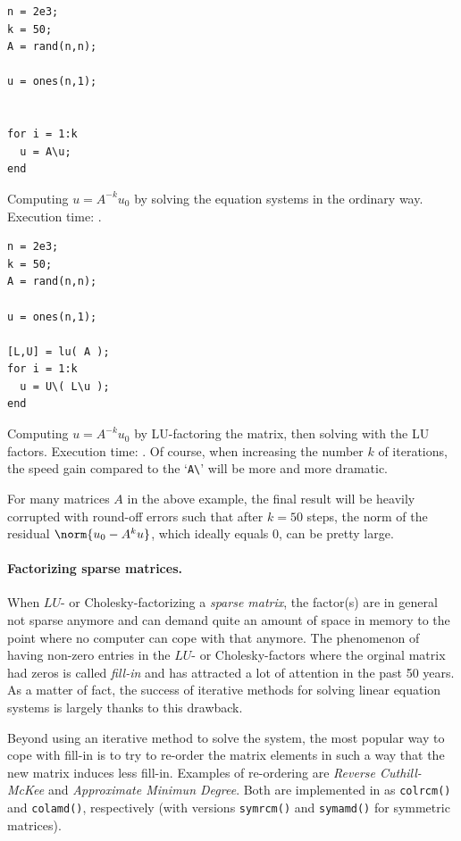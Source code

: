 \hfill
\begin{minipage}[t]{.45\textwidth}
\begin{lstlisting}[framerule=2pt,rulecolor=\color{badred}]
n = 2e3;
k = 50;
A = rand(n,n);

u = ones(n,1);


for i = 1:k
  u = A\u;
end
\end{lstlisting}
Computing $u = A^{-k}u_0$ by solving the equation systems in the ordinary way. Execution time: .
\end{minipage}
\hfill
\begin{minipage}[t]{.45\textwidth}
\begin{lstlisting}[framerule=2pt,rulecolor=\color{goodgreen}]
n = 2e3;
k = 50;
A = rand(n,n);

u = ones(n,1);

[L,U] = lu( A );
for i = 1:k
  u = U\( L\u );
end
\end{lstlisting}
Computing $u = A^{-k}u_0$ by LU-factoring the matrix, then solving with the LU factors. Execution time: . Of course, when increasing  the number $k$ of iterations, the speed gain compared to the `\lstinline!A\!' will  be more and more dramatic.
\end{minipage}
\hfill

\begin{remark}
For many matrices $A$ in the above example, the final result will be heavily corrupted with round-off errors such that after $k=50$ steps, the norm of the residual $\norm{u_0-A^ku}$, which ideally equals $0$, can be pretty large.
\end{remark}


\paragraph{Factorizing sparse matrices.}
When $LU$- or Cholesky-factorizing a \emph{sparse matrix}, the factor(s) are in general not sparse anymore and can demand quite an amount of space in memory to the point where no computer can cope with that anymore. The phenomenon of having non-zero entries in the $LU$- or Cholesky-factors where the orginal matrix had zeros is called \emph{fill-in} and has attracted a lot of attention in the past 50 years. As a matter of fact, the success of iterative methods for solving linear equation systems is largely thanks to this drawback.

Beyond using an iterative method to solve the system, the most popular way to cope with fill-in is to try to re-order the matrix elements in such a way that the new matrix induces less fill-in. Examples of re-ordering are \emph{Reverse Cuthill-McKee} and \emph{Approximate Minimun Degree}. Both are implemented in \matlab{} as \lstinline!colrcm()! and \lstinline!colamd()!, respectively (with versions \lstinline!symrcm()! and \lstinline!symamd()! for symmetric matrices).

